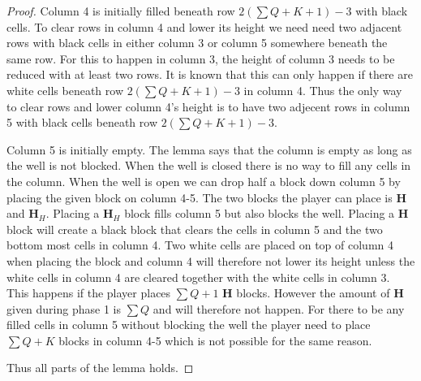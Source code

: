 \begin{proof}
Column 4 is initially filled beneath row $2 \left( \sum Q + K + 1 \right) - 3$ with black cells. To clear rows in column 4 and lower its height we need need two adjacent rows with black cells in either column 3 or column 5 somewhere beneath the same row. For this to happen in column 3, the height of column 3 needs to be reduced with at least two rows. It is known that this can only happen if there are white cells beneath row $2 \left( \sum Q + K + 1 \right) - 3$ in column 4. Thus the only way to clear rows and lower column 4's height is to have two adjecent rows in column 5 with black cells beneath row $2 \left( \sum Q + K + 1 \right) - 3$.

Column 5 is initially empty. The lemma says that the column is empty as long as the well is not blocked. When the well is closed there is no way to fill any cells in the column. When the well is open we can drop half a block down column 5 by placing the given block on column 4-5. The two blocks the player can place is $\mathbf{H}$ and $\mathbf{H}_H$. Placing a $\mathbf{H}_H$ block fills column 5 but also blocks the well. Placing a $\mathbf{H}$ block will create a black block that clears the cells in column 5 and the two bottom most cells in column 4. Two white cells are placed on top of column 4 when placing the block and column 4 will therefore not lower its height unless the white cells in column 4 are cleared together with the white cells in column 3. This happens if the player places $\sum Q + 1$ $\mathbf{H}$ blocks. However the amount of $\mathbf{H}$ given during phase 1 is $\sum Q$ and will therefore not happen. For there to be any filled cells in column 5 without blocking the well the player need to place $\sum Q + K$ blocks in column 4-5 which is not possible for the same reason.

Thus all parts of the lemma holds.


\end{proof}



